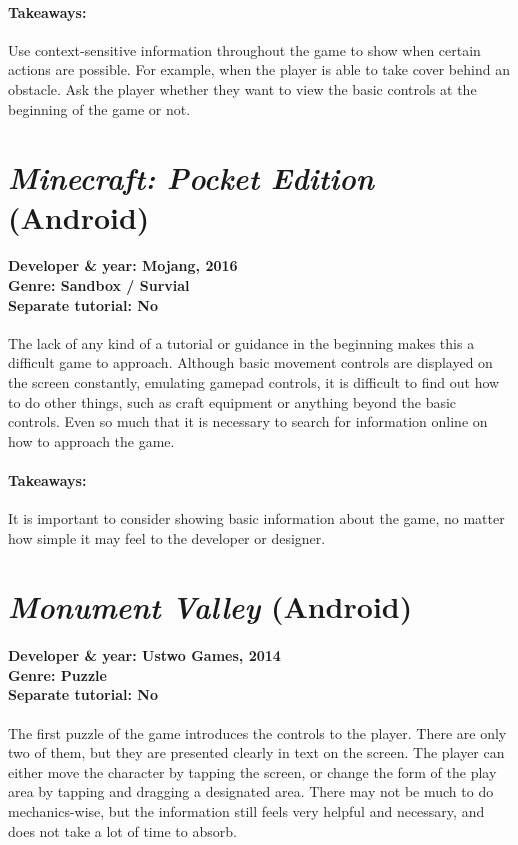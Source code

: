 \paragraph{Takeaways:}
Use context-sensitive information throughout the game to show when certain actions are possible. For example, when the player is able to take cover behind an obstacle. Ask the player whether they want to view the basic controls at the beginning of the game or not.

\section{\textit{Minecraft: Pocket Edition } (Android)}
\paragraph{Developer \& year: Mojang, 2016 \\ Genre: Sandbox / Survial \\ Separate tutorial: No \\}
The lack of any kind of a tutorial or guidance in the beginning makes this a difficult game to approach. Although basic movement controls are displayed on the screen constantly, emulating gamepad controls, it is difficult to find out how to do other things, such as craft equipment or anything beyond the basic controls. Even so much that it is necessary to search for information online on how to approach the game. 
\paragraph{Takeaways:}
It is important to consider showing basic information about the game, no matter how simple it may feel to the developer or designer.

\section{\textit{Monument Valley } (Android)}
\paragraph{Developer \& year: Ustwo Games, 2014 \\ Genre: Puzzle \\ Separate tutorial: No \\}
The first puzzle of the game introduces the controls to the player. There are only two of them, but they are presented clearly in text on the screen. The player can either move the character by tapping the screen, or change the form of the play area by tapping and dragging a designated area. There may not be much to do mechanics-wise, but the information still feels very helpful and necessary, and does not take a lot of time to absorb.
